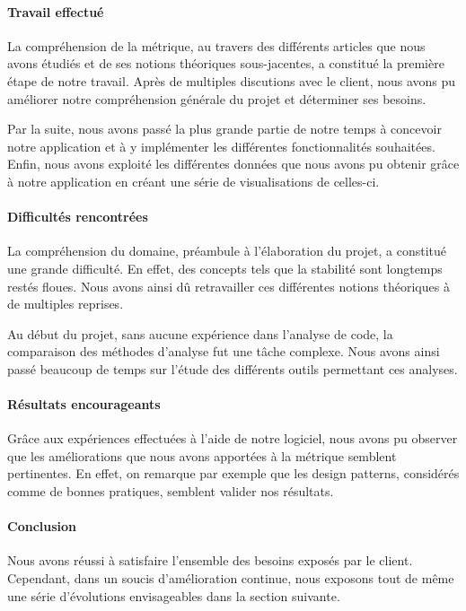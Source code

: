 \documentclass{scrartcl}
\begin{document}
    \paragraph{Travail effectué}La compréhension de la métrique, au travers des différents articles que nous avons étudiés et de ses notions théoriques sous-jacentes, a constitué la première étape de notre travail. Après de multiples discutions avec le client, nous avons pu améliorer notre compréhension générale du projet et déterminer ses besoins. 
    
    Par la suite, nous avons passé la plus grande partie de notre temps à concevoir notre application et à y implémenter les différentes fonctionnalités souhaitées. Enfin, nous avons exploité les différentes données que nous avons pu obtenir grâce à notre application en créant une série de visualisations de celles-ci.

    \paragraph{Difficultés rencontrées}La compréhension du domaine, préambule à l'élaboration du projet, a constitué une grande difficulté. En effet, des concepts tels que la stabilité sont longtemps restés floues. Nous avons ainsi dû retravailler ces différentes notions théoriques à de multiples reprises. 
    
    Au début du projet, sans aucune expérience dans l'analyse de code, la comparaison des méthodes d'analyse fut une tâche complexe. Nous avons ainsi passé beaucoup de temps sur l'étude des différents outils permettant ces analyses.
    
    \paragraph{Résultats encourageants}Grâce aux expériences effectuées à l'aide de notre logiciel, nous avons pu observer que les améliorations que nous avons apportées à la métrique semblent pertinentes. En effet, on remarque par exemple que les design patterns, considérés comme de bonnes pratiques, semblent valider nos résultats.

    \paragraph{Conclusion}Nous avons réussi à satisfaire l'ensemble des besoins exposés par le client. Cependant, dans un soucis d'amélioration continue, nous exposons tout de même une série d'évolutions envisageables dans la section suivante.
    
\end{document}
